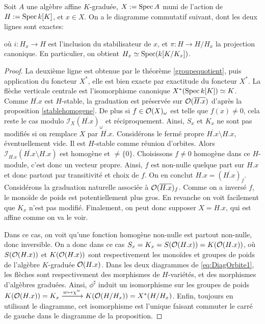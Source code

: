 \begin{prop}[Car. 0]\label{staborbitegroup}
Soit $A$ une algèbre affine $K$-graduée, $X:=\operatorname{Spec} A$ muni de l'action de $H:=\operatorname{Spec} k[K]$, et $x\in X$. On a le diagramme commutatif suivant, dont les deux lignes sont exactes:
	\begin{center}
	\end{center}
	où $i:H_x\rightarrow H$ est l'inclusion du stabilisateur de $x$, et $\pi:H\rightarrow H/H_x$ la projection canonique. En particulier, on obtient $H_x\simeq \operatorname{Spec}(k[K/K_x])$.
\end{prop}
\begin{proof}
La deuxième ligne est obtenue par le théorème \ref{groupequotient}, puis application du foncteur $X^*$, elle est bien exacte par exactitude du foncteur $X^*$. La flèche verticale centrale est l'isomorphisme canonique $X^*(\operatorname{Spec} k[K])\simeq K$. Comme $\overline{H.x}$ est $H$-stable, la graduation est préservée sur $\mathcal{O}(\overline{H.x})$ d'après la proposition \ref{stablehomogene}. De plus si $f\in \mathcal{O}(X)_{\omega}$ est telle que $f(x)\neq 0$, cela reste le cas modulo $\mathcal{I}_{X}(\overline{H.x})_\omega$ et réciproquement. Ainsi, $S_x$ et $K_x$ ne sont pas modifiés si on remplace $X$ par $\overline{H.x}$. 
Considérons le fermé propre $\overline{H.x}\setminus H.x$, éventuellement vide. Il est $H$-stable comme réunion d'orbites. Alors $\mathcal{I}_{\overline{H.x}}(\overline{H.x}\setminus H.x)$ est homogène et $\neq \lbrace 0\rbrace$. Choisissons $f\neq0$ homogène dans ce $H$-module, c'est donc un vecteur propre. Ainsi, $f$ est non-nulle quelque part sur $H.x$ et donc partout par transitivité et choix de $f$. On en conclut $H.x=(\overline{H.x})_f$. Considérons la graduation naturelle associée à $\mathcal{O}(\overline{H.x})_f$. Comme on a inversé $f$, le monoïde de poids est potentiellement plus gros. En revanche on voit facilement que $K_x$ n'est pas modifié. Finalement, on peut donc supposer $X=H.x$, qui est affine comme on va le voir. 

Dans ce cas, on voit qu'une fonction homogène non-nulle est partout non-nulle, donc inversible. On a donc dans ce cas $S_x=K_x=S(\mathcal{O}(H.x))=K(\mathcal{O}(H.x))$, où $S(\mathcal{O}(H.x))$ et $K(\mathcal{O}(H.x))$ sont respectivement les monoïdes et groupes de poids de l'algèbre $K$-graduée $\mathcal{O}(H.x)$. Dans les deux diagrammes de \ref{eq:DiagOrbite1}, les flèches sont respectivement des morphismes de $H$-variétés, et des morphismes d'algèbres graduées. Ainsi, $\phi^\sharp$ induit un isomorphisme sur les groupes de poids $K(\mathcal{O}(H.x))=K_x \xrightarrow{w \mapsto\chi^w}K(\mathcal{O}(H/H_x))=X^*(H/H_x)$. Enfin, toujours en utilisant le diagramme, cet isomorphisme est l'unique faisant commuter le carré de gauche dans le diagramme de la proposition.
\end{proof}

